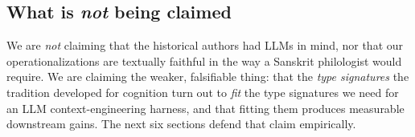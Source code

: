\subsection{\texorpdfstring{What is \emph{not} being claimed}{What is not being claimed}}\label{what-is-not-being-claimed}

We are \emph{not} claiming that the historical authors had LLMs in mind, nor that our operationalizations are textually faithful in the way a Sanskrit philologist would require. We are claiming the weaker, falsifiable thing: that the \emph{type signatures} the tradition developed for cognition turn out to \emph{fit} the type signatures we need for an LLM context-engineering harness, and that fitting them produces measurable downstream gains. The next six sections defend that claim empirically.
